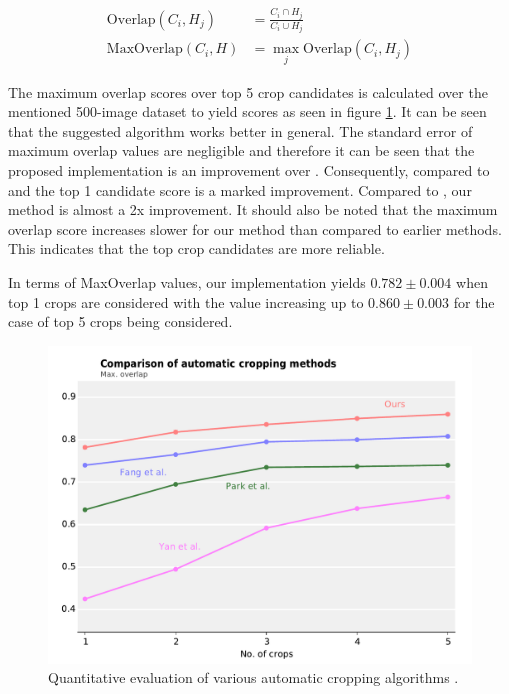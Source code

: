 \begin{align}
	\mathrm{Overlap}(C_i, H_j)  &= \frac{C_i \cap H_j}{C_i \cup H_j} \label{eq:Overlap}\\
	\mathrm{MaxOverlap}(C_i, H) &= \max_j\mathrm{Overlap}(C_i, H_j)  \label{eq:MaxOverlap}
\end{align}

The maximum overlap scores over top 5 crop candidates is calculated over the
mentioned 500-image dataset to yield scores as seen in figure \ref{fig:cropping_comparison}.
It can be seen that the suggested algorithm works better in general.
The standard error of maximum overlap values are negligible and therefore it can
be seen that the proposed implementation is an improvement over \cite{fang2014automatic}.
Consequently, compared to \cite{park2012modeling} and \cite{yan2013learning} the
top 1 candidate score is a marked improvement.
Compared to \cite{yan2013learning}, our method is almost a 2x improvement.
It should also be noted that the maximum overlap score increases slower for our
method than compared to earlier methods.
This indicates that the top crop candidates are more reliable.

In terms of \textrm{MaxOverlap} values, our implementation yields $0.782\pm0.004$
when top 1 crops are considered with the value increasing up to $0.860\pm0.003$
for the case of top 5 crops being considered.

\begin{figure}
\centering\includegraphics[width=0.8\columnwidth]{../figures/comparison.pdf}
\caption{Quantitative evaluation of various automatic cropping algorithms
	\cite{fang2014automatic,park2012modeling,yan2013learning}.\label{fig:cropping_comparison}}
\end{figure}


